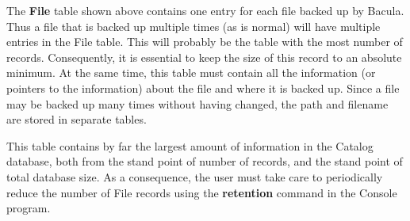 {{{The {\bf File} table shown above contains one entry for each file backed up by
Bacula. Thus a file that is backed up multiple times (as is normal) will have
multiple entries in the File table. This will probably be the table with the
most number of records. Consequently, it is essential to keep the size of this
record to an absolute minimum. At the same time, this table must contain all
the information (or pointers to the information) about the file and where it
is backed up. Since a file may be backed up many times without having changed,
the path and filename are stored in separate tables. 

This table contains by far the largest amount of information in the Catalog
database, both from the stand point of number of records, and the stand point
of total database size. As a consequence, the user must take care to
periodically reduce the number of File records using the {\bf retention}
command in the Console program. 

\ 

}}}
